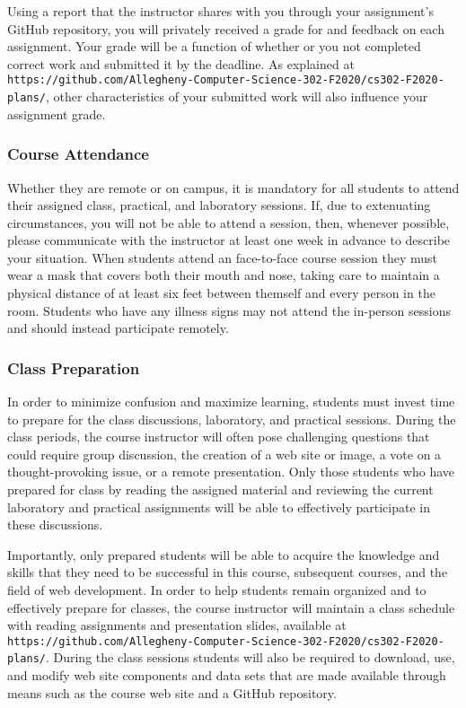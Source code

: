 \documentclass[11pt]{article}
\newcommand{\url}[1]{\lstinline{#1}}
\begin{document}
Using a report that the instructor shares with you through your assignment's
GitHub repository, you will privately received a grade for and feedback on each
assignment. Your grade will be a function of whether or you not completed
correct work and submitted it by the deadline. As explained at
\url{https://github.com/Allegheny-Computer-Science-302-F2020/cs302-F2020-plans/},
other characteristics of your submitted work will also influence your assignment
grade.

\vspace*{-.05in}

\subsubsection*{Course Attendance}

Whether they are remote or on campus, it is mandatory for all students to attend
their assigned class, practical, and laboratory sessions. If, due to extenuating
circumstances, you will not be able to attend a session, then, whenever
possible, please communicate with the instructor at least one week in advance to
describe your situation. When students attend an face-to-face course session
they must wear a mask that covers both their mouth and nose, taking care to
maintain a physical distance of at least six feet between themself and every
person in the room. Students who have any illness signs may not attend the
in-person sessions and should instead participate remotely.

\vspace*{-.05in}

\subsubsection*{Class Preparation}

In order to minimize confusion and maximize learning, students must invest time
to prepare for the class discussions, laboratory, and practical sessions. During
the class periods, the course instructor will often pose challenging questions
that could require group discussion, the creation of a web site or image, a vote
on a thought-provoking issue, or a remote presentation. Only those students who
have prepared for class by reading the assigned material and reviewing the
current laboratory and practical assignments will be able to effectively
participate in these discussions.

Importantly, only prepared students will be able to acquire the knowledge and
skills that they need to be successful in this course, subsequent courses, and
the field of web development. In order to help students remain organized and to
effectively prepare for classes, the course instructor will maintain a class
schedule with reading assignments and presentation slides, available at
\url{https://github.com/Allegheny-Computer-Science-302-F2020/cs302-F2020-plans/}.
During the class sessions students will also be required to download, use, and
modify web site components and data sets that are made available through means
such as the course web site and a GitHub repository.
\end{document}

